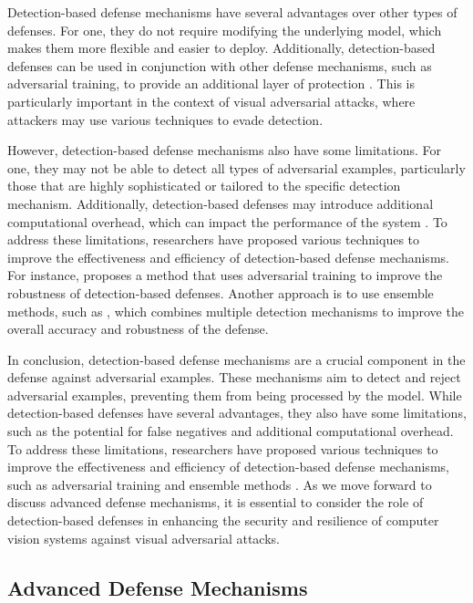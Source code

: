 \documentclass[11pt]{article}
\begin{document}
Detection-based defense mechanisms have several advantages over other types of defenses. For one, they do not require modifying the underlying model, which makes them more flexible and easier to deploy. Additionally, detection-based defenses can be used in conjunction with other defense mechanisms, such as adversarial training, to provide an additional layer of protection \cite{ref89}. This is particularly important in the context of visual adversarial attacks, where attackers may use various techniques to evade detection.

However, detection-based defense mechanisms also have some limitations. For one, they may not be able to detect all types of adversarial examples, particularly those that are highly sophisticated or tailored to the specific detection mechanism. Additionally, detection-based defenses may introduce additional computational overhead, which can impact the performance of the system \cite{ref97}. To address these limitations, researchers have proposed various techniques to improve the effectiveness and efficiency of detection-based defense mechanisms. For instance, \cite{ref98} proposes a method that uses adversarial training to improve the robustness of detection-based defenses. Another approach is to use ensemble methods, such as \cite{ref94}, which combines multiple detection mechanisms to improve the overall accuracy and robustness of the defense.

In conclusion, detection-based defense mechanisms are a crucial component in the defense against adversarial examples. These mechanisms aim to detect and reject adversarial examples, preventing them from being processed by the model. While detection-based defenses have several advantages, they also have some limitations, such as the potential for false negatives and additional computational overhead. To address these limitations, researchers have proposed various techniques to improve the effectiveness and efficiency of detection-based defense mechanisms, such as adversarial training and ensemble methods \cite{ref99}. As we move forward to discuss advanced defense mechanisms, it is essential to consider the role of detection-based defenses in enhancing the security and resilience of computer vision systems against visual adversarial attacks.

\subsection{Advanced Defense Mechanisms}
\end{document}

